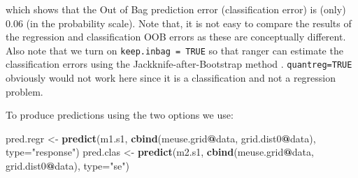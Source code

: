 \documentclass[graybox,natbib,nospthms,UStrade]{svmono}
\newenvironment{Shaded}{\begin{snugshade}}{\end{snugshade}}
\newcommand{\CommentTok}[1]{\textcolor[rgb]{0.37,0.37,0.37}{\textit{#1}}}
\newcommand{\DataTypeTok}[1]{\textcolor[rgb]{0.27,0.27,0.27}{#1}}
\newcommand{\DecValTok}[1]{\textcolor[rgb]{0.06,0.06,0.06}{#1}}
\newcommand{\KeywordTok}[1]{\textcolor[rgb]{0.27,0.27,0.27}{\textbf{#1}}}
\newcommand{\NormalTok}[1]{#1}
\newcommand{\OperatorTok}[1]{\textcolor[rgb]{0.43,0.43,0.43}{\textbf{#1}}}
\newcommand{\OtherTok}[1]{\textcolor[rgb]{0.37,0.37,0.37}{#1}}
\newcommand{\StringTok}[1]{\textcolor[rgb]{0.5,0.5,0.5}{#1}}
\begin{document}
\begin{Shaded}
\end{Shaded}

which shows that the Out of Bag prediction error (classification error) is (only)
0.06 (in the probability scale). Note that, it is not easy to compare the results
of the regression and classification OOB errors as these are conceptually different.
Also note that we turn on \texttt{keep.inbag\ =\ TRUE} so that ranger can estimate the
classification errors using the Jackknife-after-Bootstrap method \citep{wager2014confidence}.
\texttt{quantreg=TRUE} obviously would not work here since it is a classification and not a regression problem.

To produce predictions using the two options we use:

\begin{Shaded}
\begin{Highlighting}[]
\NormalTok{pred.regr <-}\StringTok{ }\KeywordTok{predict}\NormalTok{(m1.s1, }\KeywordTok{cbind}\NormalTok{(meuse.grid}\OperatorTok{@}\NormalTok{data, grid.dist0}\OperatorTok{@}\NormalTok{data), }\DataTypeTok{type=}\StringTok{"response"}\NormalTok{)}
\NormalTok{pred.clas <-}\StringTok{ }\KeywordTok{predict}\NormalTok{(m2.s1, }\KeywordTok{cbind}\NormalTok{(meuse.grid}\OperatorTok{@}\NormalTok{data, grid.dist0}\OperatorTok{@}\NormalTok{data), }\DataTypeTok{type=}\StringTok{"se"}\NormalTok{)}
\end{Highlighting}
\end{Shaded}
\end{document}
